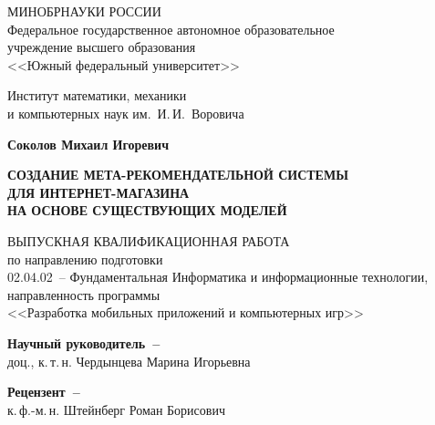 


\thispagestyle{empty}
\begin{singlespacing} 
\begin{center}

МИНОБРНАУКИ РОССИИ\\ [12pt]
Федеральное государственное автономное образовательное\\
учреждение высшего образования\\
<<Южный федеральный университет>>

\vspace{\baselineskip}
Институт математики, механики\\
и компьютерных наук им.~И.\,И.~Воровича


\vfill
\textbf{Соколов Михаил Игоревич}

\vspace{15mm}
{\bf СОЗДАНИЕ МЕТА-РЕКОМЕНДАТЕЛЬНОЙ СИСТЕМЫ \\
ДЛЯ ИНТЕРНЕТ-МАГАЗИНА \\
НА ОСНОВЕ СУЩЕСТВУЮЩИХ МОДЕЛЕЙ }

\vspace{15mm}
ВЫПУСКНАЯ КВАЛИФИКАЦИОННАЯ РАБОТА\\
по направлению подготовки\\
02.04.02~-- Фундаментальная Информатика и информационные технологии,\\
направленность программы\\
<<Разработка мобильных приложений и компьютерных игр>>

\vspace{10mm}
\textbf{Научный руководитель~--}\\
доц., к.\,т.\,н. Чердынцева Марина Игорьевна

\vspace{7mm}
\textbf{Рецензент~--}\\
к.\,ф.-м.\,н. Штейнберг Роман Борисович 



\end{center}
\end{singlespacing}
